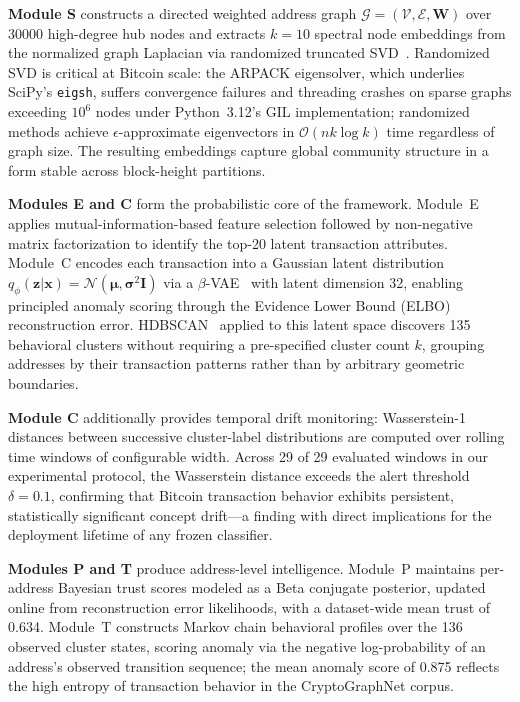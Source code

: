 \documentclass[journal]{IEEEtran}
\begin{document}
\textbf{Module S} constructs a directed weighted address graph
$\mathcal{G} = (\mathcal{V}, \mathcal{E}, \mathbf{W})$ over \num{30000}
high-degree hub nodes and extracts $k=10$ spectral node embeddings from the
normalized graph Laplacian via randomized truncated SVD~\cite{Halko2011}.
Randomized SVD is critical at Bitcoin scale: the ARPACK eigensolver, which
underlies SciPy's \texttt{eigsh}, suffers convergence failures and threading
crashes on sparse graphs exceeding $10^6$ nodes under Python~3.12's GIL
implementation; randomized methods achieve $\epsilon$-approximate
eigenvectors in $\mathcal{O}(nk\log k)$ time regardless of graph size.
The resulting embeddings capture global community structure in a form stable
across block-height partitions.

\textbf{Modules E and C} form the probabilistic core of the framework.
Module~E applies mutual-information-based feature selection followed by
non-negative matrix factorization to identify the top-20 latent transaction
attributes.
Module~C encodes each transaction into a Gaussian latent distribution
$q_\phi(\mathbf{z}|\mathbf{x}) = \mathcal{N}(\boldsymbol{\mu}, \boldsymbol{\sigma}^2\mathbf{I})$
via a $\beta$-VAE~\cite{Kingma2014} with latent dimension \num{32},
enabling principled anomaly scoring through the Evidence Lower Bound (ELBO)
reconstruction error.
HDBSCAN~\cite{McInnes2017} applied to this latent space discovers \num{135}
behavioral clusters without requiring a pre-specified cluster count $k$,
grouping addresses by their transaction patterns rather than by arbitrary
geometric boundaries.

\textbf{Module C} additionally provides temporal drift monitoring: Wasserstein-1
distances between successive cluster-label distributions are computed over
rolling time windows of configurable width.
Across \num{29} of \num{29} evaluated windows in our experimental protocol,
the Wasserstein distance exceeds the alert threshold $\delta = 0.1$,
confirming that Bitcoin transaction behavior exhibits persistent, statistically
significant concept drift---a finding with direct implications for the
deployment lifetime of any frozen classifier.

\textbf{Modules P and T} produce address-level intelligence.
Module~P maintains per-address Bayesian trust scores modeled as a Beta
conjugate posterior, updated online from reconstruction error likelihoods,
with a dataset-wide mean trust of \num{0.634}.
Module~T constructs Markov chain behavioral profiles over the \num{136}
observed cluster states, scoring anomaly via the negative log-probability
of an address's observed transition sequence; the mean anomaly score of
\num{0.875} reflects the high entropy of transaction behavior in the
CryptoGraphNet corpus.
\end{document}

